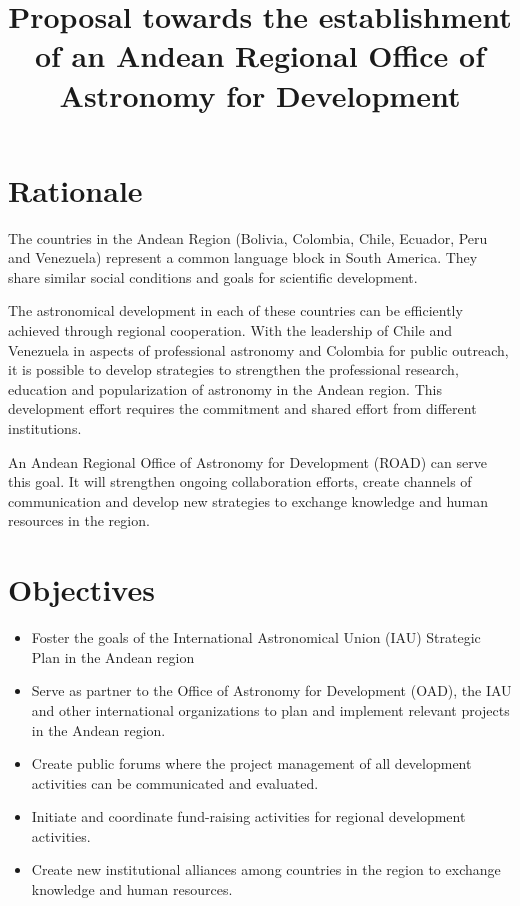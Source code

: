 \documentclass[12pt]{article}
\title{Proposal towards the establishment of an Andean Regional Office of
  Astronomy for Development}
\begin{document}
\maketitle
\tableofcontents
\section{Rationale}

The countries in the Andean Region (Bolivia, Colombia, Chile, Ecuador,
Peru and Venezuela) represent a common language block in South
America. They share similar social conditions and goals for scientific
development.  

The astronomical development in each of these countries can be
efficiently achieved through regional cooperation. With the leadership
of Chile and Venezuela in aspects of professional astronomy and
Colombia for public outreach, it is possible to develop strategies to
strengthen the professional research, education and popularization of
astronomy in the Andean region. This development effort requires the
commitment and shared effort from different institutions. 

An Andean Regional Office of Astronomy for Development (ROAD) can
serve this goal.  It will strengthen ongoing collaboration efforts,
create channels of communication and develop new strategies to
exchange knowledge and human resources in the region.  

\section{Objectives}
\begin{itemize}
\item
Foster the goals of the International Astronomical Union (IAU) Strategic Plan in the Andean region
\item
Serve as partner to the Office of Astronomy for Development (OAD), the IAU and other international
organizations to plan and implement relevant projects in the Andean
region. 
\item
Create public forums where the project management of all development
activities can be communicated and evaluated. 
\item
Initiate and coordinate fund-raising activities for regional
development activities. 
\item
Create new institutional alliances among countries in the region to
exchange knowledge and human resources. 
\end{itemize}
\end{document}
